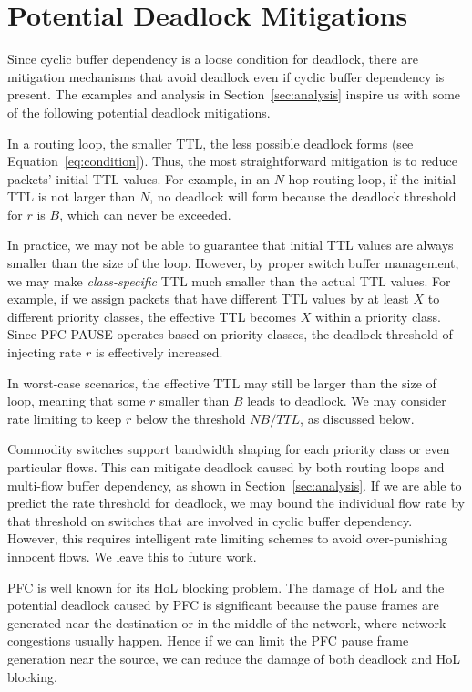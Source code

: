 \secspace
\section{Potential Deadlock Mitigations}
\label{sec:mitigation}
\secspace

Since cyclic buffer dependency is a loose condition for deadlock, there are
mitigation mechanisms that avoid deadlock even if cyclic buffer dependency is present.
The examples and analysis in Section~\ref{sec:analysis}
inspire us with some of the following potential deadlock mitigations.


 In a routing loop, 
the smaller TTL, the less possible deadlock forms (see Equation~\ref{eq:condition}).
Thus, the most straightforward mitigation is to reduce packets' initial TTL values.
For example, in an $N$-hop routing loop, if the initial TTL is not larger than $N$,
no deadlock will form because the deadlock threshold for $r$ is $B$, which can
never be exceeded.

In practice, we may not be able to guarantee that initial TTL values are always smaller than
the size of the loop. However, by proper switch buffer management, we may make {\em class-specific}
TTL much smaller than the actual TTL values. For example, if we assign packets 
that have different TTL values by at least $X$ to different priority classes, the effective TTL becomes $X$
within a priority class. Since PFC PAUSE operates based on priority classes, the deadlock threshold
of injecting rate $r$ is effectively increased.

In worst-case scenarios, the effective TTL may still be larger than the size of loop, meaning
that some $r$ smaller than $B$ leads to deadlock. We may consider rate limiting to keep
$r$ below the threshold $NB/TTL$, as discussed below.

 Commodity switches support bandwidth shaping for each priority class
or even particular flows. This can mitigate deadlock caused by both routing loops and multi-flow
buffer dependency, as shown in Section~\ref{sec:analysis}. If we are able to predict the rate 
threshold for deadlock, we may bound the individual flow rate by that threshold on switches 
that are involved in cyclic buffer dependency. However, this requires intelligent rate
limiting schemes to avoid over-punishing innocent flows. We leave this to future work.


PFC is well known for its HoL blocking problem. The damage of HoL and the potential deadlock caused 
by PFC is significant because the pause frames are generated near the destination or in the middle of 
the network, where network congestions usually happen. Hence if we can limit the PFC pause frame 
generation near the source, we can reduce the damage of both deadlock and HoL blocking. 

